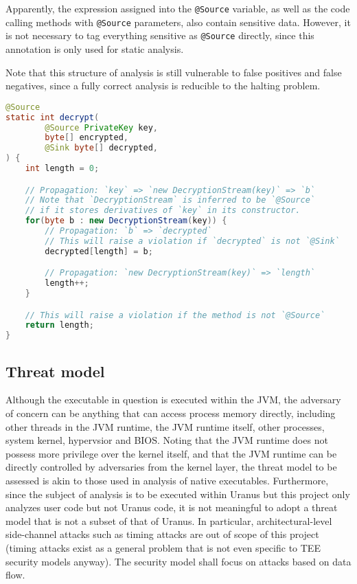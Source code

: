 \documentclass[a4paper, 10pt]{article}
\begin{document}
Apparently, the expression assigned into the \texttt{@Source} variable,
as well as the code calling methods with \texttt{@Source} parameters,
also contain sensitive data.
However, it is not necessary to tag everything sensitive as \texttt{@Source} directly,
since this annotation is only used for static analysis.

Note that this structure of analysis is still vulnerable to false positives and false negatives,
since a fully correct analysis is reducible to the halting problem.

\begin{lstlisting}[language=Java, caption=Examples, style=j]
@Source
static int decrypt(
		@Source PrivateKey key,
		byte[] encrypted,
		@Sink byte[] decrypted,
) {
	int length = 0;

	// Propagation: `key` => `new DecryptionStream(key)` => `b`
	// Note that `DecryptionStream` is inferred to be `@Source`
	// if it stores derivatives of `key` in its constructor.
	for(byte b : new DecryptionStream(key)) {
		// Propagation: `b` => `decrypted`
		// This will raise a violation if `decrypted` is not `@Sink`
		decrypted[length] = b;

		// Propagation: `new DecryptionStream(key)` => `length`
		length++;
	}

	// This will raise a violation if the method is not `@Source`
	return length;
}
\end{lstlisting}

\subsection{Threat model}
Although the executable in question is executed within the JVM,
the adversary of concern can be anything that can access process memory directly,
including other threads in the JVM runtime, the JVM runtime itself,
other processes, system kernel, hypervsior and BIOS.
Noting that the JVM runtime
does not possess more privilege over the kernel itself,
and that the JVM runtime can be directly controlled by adversaries from the kernel layer,
the threat model to be assessed is akin to those used in analysis of native executables.
Furthermore, since the subject of analysis is to be executed within Uranus
but this project only analyzes user code but not Uranus code,
it is not meaningful to adopt a threat model that is not a subset of that of Uranus.
In particular, architectural-level side-channel attacks such as timing attacks
are out of scope of this project
(timing attacks exist as a general problem
that is not even specific to TEE security models anyway).
The security model shall focus on attacks based on data flow.
\end{document}

